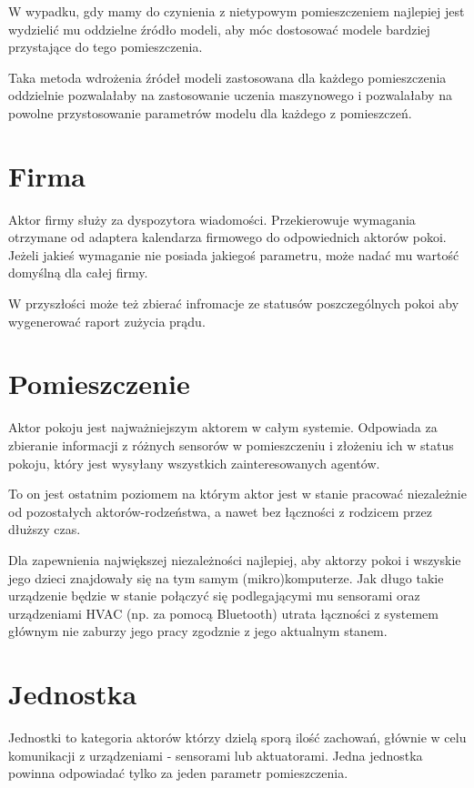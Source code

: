 W wypadku, gdy mamy do czynienia z nietypowym pomieszczeniem najlepiej jest wydzielić mu oddzielne źródło modeli, aby móc dostosować modele bardziej przystające do tego pomieszczenia. 



Taka metoda wdrożenia źródeł modeli zastosowana dla każdego pomieszczenia oddzielnie pozwalałaby na zastosowanie uczenia maszynowego i pozwalałaby na powolne przystosowanie parametrów modelu dla każdego z pomieszczeń. 



\section{Firma}
Aktor firmy służy za dyspozytora wiadomości. Przekierowuje wymagania otrzymane od adaptera kalendarza firmowego do odpowiednich aktorów pokoi.
Jeżeli jakieś wymaganie nie posiada jakiegoś parametru, może nadać mu wartość domyślną dla całej firmy.

W przyszłości może też zbierać infromacje ze statusów poszczególnych pokoi aby wygenerować raport zużycia prądu.

\section{Pomieszczenie}
Aktor pokoju jest najważniejszym aktorem w całym systemie. 
Odpowiada za zbieranie informacji z różnych sensorów w pomieszczeniu i złożeniu ich w status pokoju, który jest wysyłany wszystkich zainteresowanych agentów.

To on jest ostatnim poziomem na którym aktor jest w stanie pracować niezależnie od pozostałych aktorów-rodzeństwa, a nawet bez łączności z rodzicem przez dłuższy czas. 

Dla zapewnienia największej niezależności najlepiej, aby aktorzy pokoi i wszyskie jego dzieci znajdowały się na tym samym (mikro)komputerze. Jak długo takie urządzenie będzie w stanie połączyć się podlegającymi mu sensorami oraz urządzeniami HVAC (np. za pomocą Bluetooth) utrata łączności z systemem głównym nie zaburzy jego pracy zgodznie z jego aktualnym stanem.


\section{Jednostka} 
Jednostki to kategoria aktorów którzy dzielą sporą ilość zachowań, głównie w celu komunikacji z urządzeniami - sensorami lub aktuatorami. Jedna jednostka powinna odpowiadać tylko za jeden parametr pomieszczenia. 

